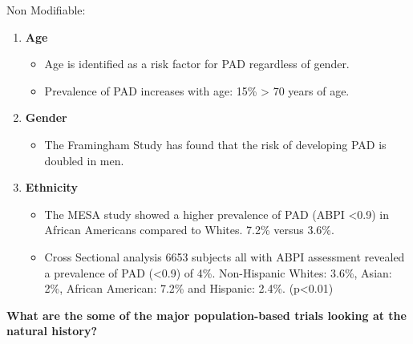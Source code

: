 \documentclass[
]{book}
\providecommand{\tightlist}{%
  \setlength{\itemsep}{0pt}\setlength{\parskip}{0pt}}
\begin{document}
Non Modifiable:

\begin{enumerate}
\def\labelenumi{\arabic{enumi}.}
\item
  \textbf{Age}

  \begin{itemize}
  \item
    Age is identified as a risk factor for PAD regardless of gender.
  \item
    Prevalence of PAD increases with age: 15\% \textgreater{} 70 years of age.
  \end{itemize}
\item
  \textbf{Gender}

  \begin{itemize}
  \tightlist
  \item
    The Framingham Study has found that the risk of developing PAD
    is doubled in men.
  \end{itemize}
\item
  \textbf{Ethnicity}

  \begin{itemize}
  \item
    The MESA study showed a higher prevalence of PAD (ABPI \textless0.9) in
    African Americans compared to Whites. 7.2\% versus 3.6\%.
    \citep{bildMultiEthnicStudyAtherosclerosis2002}
  \item
    Cross Sectional analysis 6653 subjects all with ABPI assessment
    revealed a prevalence of PAD (\textless0.9) of 4\%. Non-Hispanic Whites:
    3.6\%, Asian: 2\%, African American: 7.2\% and Hispanic: 2.4\%.
    (p\textless0.01) \citep{allisonEffectNovelCardiovascular2006}
  \end{itemize}
\end{enumerate}

\textbf{What are the some of the major population-based trials looking at the
natural history?}
\end{document}
